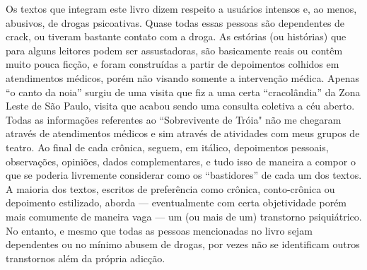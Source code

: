 Os textos que integram este livro dizem respeito a usuários intensos e, ao
menos, abusivos, de drogas psicoativas. Quase todas essas pessoas são
dependentes de crack, ou tiveram bastante contato com a droga.
As estórias (ou histórias) que para alguns leitores podem ser assustadoras,
são basicamente reais ou contêm muito pouca ficção, e foram construídas a
partir de depoimentos colhidos em atendimentos médicos, porém não visando
somente a intervenção médica.
Apenas ``o canto da noia'' surgiu de uma visita que fiz a uma
certa “cracolândia” da Zona Leste de São Paulo, visita que acabou sendo uma
consulta coletiva a céu aberto.
Todas as informações referentes ao ``Sobrevivente de Tróia"
não me chegaram através de atendimentos médicos e sim através de atividades com
meus grupos de teatro.
Ao final de cada crônica, seguem, em itálico, depoimentos pessoais,
observações, opiniões, dados complementares, e tudo isso de maneira a compor o
que se poderia livremente considerar como os “bastidores” de cada um dos
textos.
A maioria dos textos, escritos de preferência como crônica, conto-crônica ou
depoimento estilizado, aborda — eventualmente com certa objetividade porém mais
comumente de maneira vaga — um (ou mais de um) transtorno psiquiátrico.
No entanto, e mesmo que todas as pessoas mencionadas no livro sejam dependentes
ou no mínimo abusem de drogas, por vezes não se identificam outros transtornos
além da própria adicção.\par
